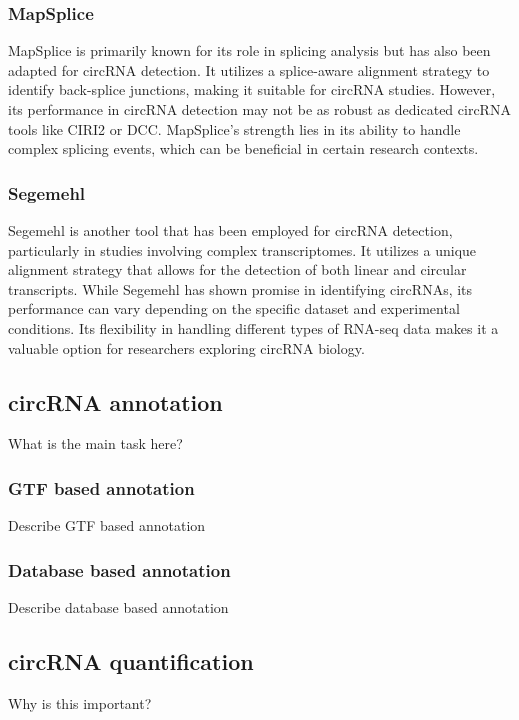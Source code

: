 \subsubsection{MapSplice}
MapSplice is primarily known for its role in splicing analysis but has also
been adapted for circRNA detection.
It utilizes a splice-aware alignment strategy to identify back-splice
junctions, making it suitable for circRNA studies.
However, its performance in circRNA detection may not be as robust as dedicated
circRNA tools like CIRI2 or
DCC\supercite{zeng_comprehensive_2017,chuang_nclscan_2016}.
MapSplice's strength lies in its ability to handle complex splicing events,
which can be beneficial in certain research contexts.

\subsubsection{Segemehl}
Segemehl is another tool that has been employed for circRNA detection,
particularly in studies involving complex transcriptomes.
It utilizes a unique alignment strategy that allows for the detection of both
linear and circular transcripts.
While Segemehl has shown promise in identifying circRNAs, its performance can
vary depending on the specific dataset and experimental
conditions\supercite{gao_ciri_2015,zeng_comprehensive_2017}.
Its flexibility in handling different types of RNA-seq data makes it a valuable
option for researchers exploring circRNA biology.

\subsection{circRNA annotation}
What is the main task here?

\subsubsection{GTF based annotation}
Describe GTF based annotation 

\subsubsection{Database based annotation} Describe database based annotation

\subsection{circRNA quantification} 

Why is this important?

